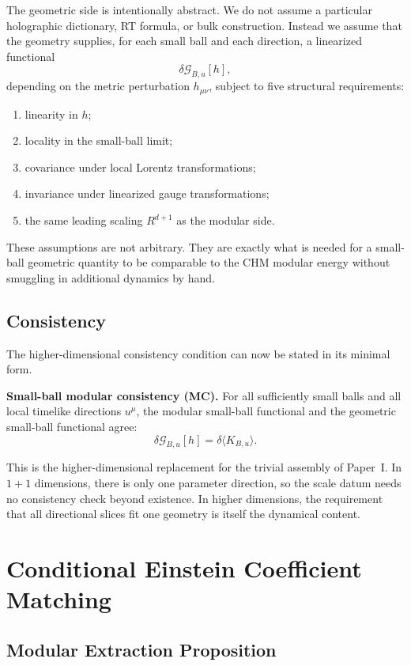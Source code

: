 \documentclass[12pt]{article}
\theoremstyle{definition}
\theoremstyle{remark}
\begin{document}
The geometric side is intentionally abstract. We do not assume a particular holographic dictionary, RT formula\cite{RyuTakayanagi2006}, or bulk construction. Instead we assume that the geometry supplies, for each small ball and each direction, a linearized functional
\[
\delta\mathcal{G}_{B,u}[h],
\]
depending on the metric perturbation \(h_{\mu\nu}\), subject to five structural requirements:
\begin{enumerate}
\item linearity in \(h\);
\item locality in the small-ball limit;
\item covariance under local Lorentz transformations;
\item invariance under linearized gauge transformations;
\item the same leading scaling \(R^{d+1}\) as the modular side.
\end{enumerate}
These assumptions are not arbitrary. They are exactly what is needed for a small-ball geometric quantity to be comparable to the CHM modular energy without smuggling in additional dynamics by hand.

\subsection{Consistency}\label{subsec:3.4}

The higher-dimensional consistency condition can now be stated in its minimal form.

\textbf{Small-ball modular consistency (MC).}
For all sufficiently small balls and all local timelike directions \(u^\mu\), the modular small-ball functional and the geometric small-ball functional agree:
\[
\delta\mathcal{G}_{B,u}[h]
=
\delta\langle K_{B,u}\rangle.
\]

This is the higher-dimensional replacement for the trivial assembly of Paper~I\cite{PaperI}. In \(1+1\) dimensions, there is only one parameter direction, so the scale datum needs no consistency check beyond existence. In higher dimensions, the requirement that all directional slices fit one geometry is itself the dynamical content.

\section{Conditional Einstein Coefficient Matching}\label{sec:4}

\subsection{Modular Extraction Proposition}\label{subsec:4.1}
\end{document}
